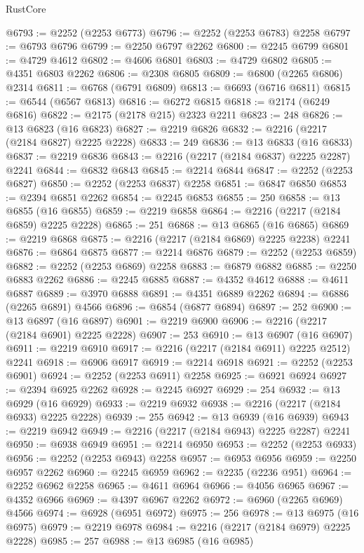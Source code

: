 \begin{lexlean}{RustCore}
\begin{coremodule}
@6793 := @2252 (@2253 @6773)
@6796 := @2252 (@2253 @6783) @2258
@6797 := @6793 @6796
@6799 := @2250 @6797 @2262
@6800 := @2245 @6799
@6801 := @4729 @4612
@6802 := @4606 @6801
@6803 := @4729 @6802
@6805 := @4351 @6803 @2262
@6806 := @2308 @6805
@6809 := @6800 (@2265 @6806) @2314
@6811 := @6768 (@6791 @6809)
@6813 := @6693 (@6716 @6811)
@6815 := @6544 (@6567 @6813)
@6816 := @6272 @6815
@6818 := @2174 (@6249 @6816)
@6822 := @2175 (@2178 @215) @2323 @2211
@6823 := 248
@6826 := @13 @6823 (@16 @6823)
@6827 := @2219 @6826
@6832 := @2216 (@2217 (@2184 @6827) @2225 @2228)
@6833 := 249
@6836 := @13 @6833 (@16 @6833)
@6837 := @2219 @6836
@6843 := @2216 (@2217 (@2184 @6837) @2225 @2287) @2241
@6844 := @6832 @6843
@6845 := @2214 @6844
@6847 := @2252 (@2253 @6827)
@6850 := @2252 (@2253 @6837) @2258
@6851 := @6847 @6850
@6853 := @2394 @6851 @2262
@6854 := @2245 @6853
@6855 := 250
@6858 := @13 @6855 (@16 @6855)
@6859 := @2219 @6858
@6864 := @2216 (@2217 (@2184 @6859) @2225 @2228)
@6865 := 251
@6868 := @13 @6865 (@16 @6865)
@6869 := @2219 @6868
@6875 := @2216 (@2217 (@2184 @6869) @2225 @2238) @2241
@6876 := @6864 @6875
@6877 := @2214 @6876
@6879 := @2252 (@2253 @6859)
@6882 := @2252 (@2253 @6869) @2258
@6883 := @6879 @6882
@6885 := @2250 @6883 @2262
@6886 := @2245 @6885
@6887 := @4352 @4612
@6888 := @4611 @6887
@6889 := @3970 @6888
@6891 := @4351 @6889 @2262
@6894 := @6886 (@2265 @6891) @4566
@6896 := @6854 (@6877 @6894)
@6897 := 252
@6900 := @13 @6897 (@16 @6897)
@6901 := @2219 @6900
@6906 := @2216 (@2217 (@2184 @6901) @2225 @2228)
@6907 := 253
@6910 := @13 @6907 (@16 @6907)
@6911 := @2219 @6910
@6917 := @2216 (@2217 (@2184 @6911) @2225 @2512) @2241
@6918 := @6906 @6917
@6919 := @2214 @6918
@6921 := @2252 (@2253 @6901)
@6924 := @2252 (@2253 @6911) @2258
@6925 := @6921 @6924
@6927 := @2394 @6925 @2262
@6928 := @2245 @6927
@6929 := 254
@6932 := @13 @6929 (@16 @6929)
@6933 := @2219 @6932
@6938 := @2216 (@2217 (@2184 @6933) @2225 @2228)
@6939 := 255
@6942 := @13 @6939 (@16 @6939)
@6943 := @2219 @6942
@6949 := @2216 (@2217 (@2184 @6943) @2225 @2287) @2241
@6950 := @6938 @6949
@6951 := @2214 @6950
@6953 := @2252 (@2253 @6933)
@6956 := @2252 (@2253 @6943) @2258
@6957 := @6953 @6956
@6959 := @2250 @6957 @2262
@6960 := @2245 @6959
@6962 := @2235 (@2236 @951)
@6964 := @2252 @6962 @2258
@6965 := @4611 @6964
@6966 := @4056 @6965
@6967 := @4352 @6966
@6969 := @4397 @6967 @2262
@6972 := @6960 (@2265 @6969) @4566
@6974 := @6928 (@6951 @6972)
@6975 := 256
@6978 := @13 @6975 (@16 @6975)
@6979 := @2219 @6978
@6984 := @2216 (@2217 (@2184 @6979) @2225 @2228)
@6985 := 257
@6988 := @13 @6985 (@16 @6985)

\end{coremodule}
\end{lexlean}
